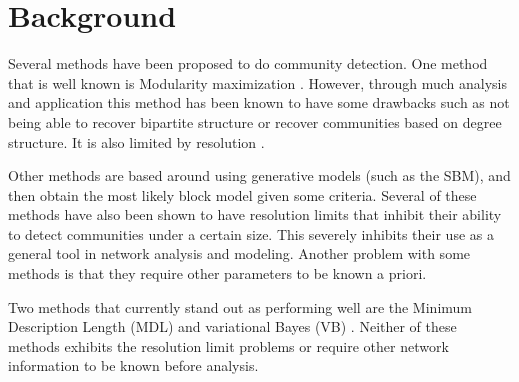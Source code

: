 \documentclass[twocolumn,twoside]{IEEEtran}
\begin{document}
\section*{Background}\label{sec:Background} Several methods have been proposed
to do community detection. One method that is well known is Modularity
maximization \cite{Newman2004}. However, through much analysis and application
this method has been known to have some drawbacks such as not being able to
recover bipartite structure \cite{Peixoto2013} or recover communities based on
degree structure. It is also limited by resolution 
\cite{fortunato2007resolution}.

Other methods are based around using generative models (such as the SBM), and
then obtain the most likely block model given some criteria. Several of these
methods have also been shown to have resolution
limits\cite{fortunato2007resolution} that inhibit their ability to detect
communities under a certain size. This severely inhibits their use as a general
tool in network analysis and modeling. Another problem with some methods is
that they require other parameters to be known a priori.

Two methods that currently stand out as performing well are the Minimum
Description Length (MDL) \cite{Peixoto2013} and variational Bayes (VB)
\cite{Hofman2008}. Neither of these methods exhibits the resolution limit
problems or require other network information to be known before analysis.
\end{document}
